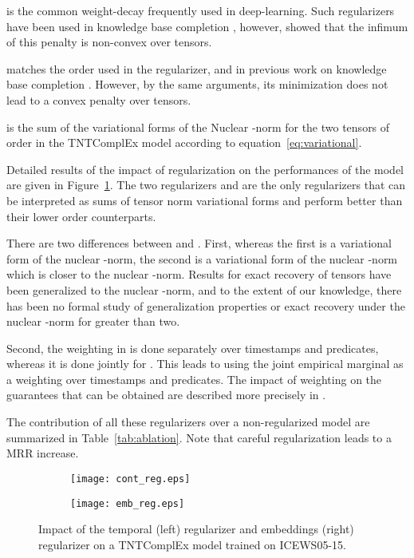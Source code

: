 \documentclass{article}
\begin{document}
 is the common weight-decay frequently used in deep-learning. Such regularizers have been used in knowledge base completion \citep{nickel_three-way_2011, nickel_holographic_2015, trouillon_complex_2016}, however, \citet{lacroix2018canonical} showed that the infimum of this penalty is non-convex over tensors.

 matches the order used in the  regularizer, and in previous work on knowledge base completion \citep{lacroix2018canonical}. However, by the same arguments, its minimization does not lead to a convex penalty over tensors.

 is the sum of the variational forms of the Nuclear -norm for the two tensors of order  in the TNTComplEx model according to equation~\eqref{eq:variational}.

Detailed results of the impact of regularization on the performances of the model are given in Figure~\ref{fig:ablation}. The two regularizers  and  are the only regularizers that can be interpreted as sums of tensor norm variational forms and perform better than their lower order counterparts.

There are two differences between  and . First, whereas the first is a variational form of the nuclear -norm, the second is a variational form of the nuclear -norm which is closer to the nuclear -norm. Results for exact recovery of tensors have been generalized to the nuclear -norm, and to the extent of our knowledge, there has been no formal study of generalization properties or exact recovery under the nuclear -norm for  greater than two. 

Second, the weighting in  is done separately over timestamps and predicates, whereas it is done jointly for . This leads to using the joint empirical marginal as a weighting over timestamps and predicates. The impact of weighting on the guarantees that can be obtained are described more precisely in \citet{foygel_learning_2011}.

The contribution of all these regularizers over a non-regularized model are summarized in Table~\ref{tab:ablation}. Note that careful regularization leads to a  MRR increase.

\begin{figure}[t]
\centering
    \begin{subfigure}[b]{0.48\textwidth}
      \centering \texttt{[image: cont\_reg.eps]}
    \end{subfigure}
    \hfill
    \begin{subfigure}[b]{0.48\textwidth}
      \centering \texttt{[image: emb\_reg.eps]}
    \end{subfigure}
    \caption{Impact of the temporal (left) regularizer and embeddings (right) regularizer on a TNTComplEx model trained on ICEWS05-15. 
}
    \label{fig:ablation}
\end{figure}
\end{document}
